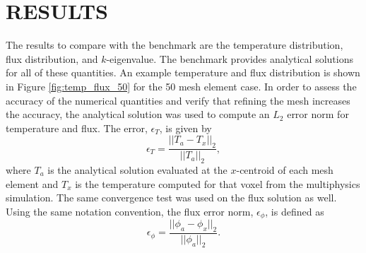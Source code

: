 \documentclass[letterpaper]{mc2023}
\begin{document}
\section{RESULTS}\label{sec:results}
The results to compare with the benchmark are the temperature distribution, flux distribution, and $k$-eigenvalue. The benchmark provides
analytical solutions for all of these quantities. An example temperature and flux distribution is shown in Figure \ref{fig:temp_flux_50}
for the 50 mesh element case. In order to assess the accuracy of the numerical quantities and verify that refining the mesh increases the accuracy, the analytical solution
was used to compute an $L_{2}$ error norm for temperature and flux. The error, $\epsilon_{T}$, is given by
\begin{equation}
    \epsilon_{T} = \frac{|| T_{a} - T_{x} ||_{2}}{|| T_{a} ||_{2}},
\end{equation}
where $T_{a}$ is the analytical solution evaluated at the $x$-centroid of each mesh element and $T_{x}$ is the temperature computed for that
voxel from the multiphysics simulation. The same convergence test was used on the flux solution as well. Using the same notation convention,
the flux error norm, $\epsilon_{\phi}$, is defined as
\begin{equation}
    \epsilon_{\phi} =  \frac{|| \phi_{a} - \phi_{x} ||_{2}}{|| \phi_{a} ||_{2}}.
\end{equation}
\end{document}
